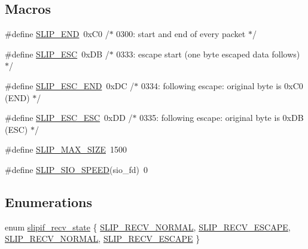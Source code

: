 \subsection*{Macros}
\begin{DoxyCompactItemize}
\item 
\#define \hyperlink{openmote-cc2538_2lwip_2src_2netif_2slipif_8c_ac08c4b8e75c6456f5654145f8b001005}{S\+L\+I\+P\+\_\+\+E\+ND}~0x\+C0 /$\ast$ 0300\+: start and end of every packet $\ast$/
\item 
\#define \hyperlink{openmote-cc2538_2lwip_2src_2netif_2slipif_8c_a379cfa838122508f0e88fbbe8ce80c47}{S\+L\+I\+P\+\_\+\+E\+SC}~0x\+D\+B /$\ast$ 0333\+: escape start (one byte escaped data follows) $\ast$/
\item 
\#define \hyperlink{openmote-cc2538_2lwip_2src_2netif_2slipif_8c_a660be27a37d4105d47000a333dd26c1a}{S\+L\+I\+P\+\_\+\+E\+S\+C\+\_\+\+E\+ND}~0x\+D\+C /$\ast$ 0334\+: following escape\+: original byte is 0x\+C0 (\+E\+N\+D) $\ast$/
\item 
\#define \hyperlink{openmote-cc2538_2lwip_2src_2netif_2slipif_8c_a75cd5d5e3cdfa54f2a7c6d137406bb72}{S\+L\+I\+P\+\_\+\+E\+S\+C\+\_\+\+E\+SC}~0x\+D\+D /$\ast$ 0335\+: following escape\+: original byte is 0x\+D\+B (\+E\+S\+C) $\ast$/
\item 
\#define \hyperlink{openmote-cc2538_2lwip_2src_2netif_2slipif_8c_accf448f9dabb0f33ef46b40355691cab}{S\+L\+I\+P\+\_\+\+M\+A\+X\+\_\+\+S\+I\+ZE}~1500
\item 
\#define \hyperlink{openmote-cc2538_2lwip_2src_2netif_2slipif_8c_a2a9e9ed81732a6794a9b9a712f75a1cc}{S\+L\+I\+P\+\_\+\+S\+I\+O\+\_\+\+S\+P\+E\+ED}(sio\+\_\+fd)~0
\end{DoxyCompactItemize}
\subsection*{Enumerations}
\begin{DoxyCompactItemize}
\item 
enum \hyperlink{openmote-cc2538_2lwip_2src_2netif_2slipif_8c_ad55f60b1f38e904fddc564c425f2eade}{slipif\+\_\+recv\+\_\+state} \{ \hyperlink{native_2lwip_2src_2netif_2slipif_8c_ad55f60b1f38e904fddc564c425f2eadea76ffc42dd0ef84fa1a9aabaa8bb8d910}{S\+L\+I\+P\+\_\+\+R\+E\+C\+V\+\_\+\+N\+O\+R\+M\+AL}, 
\hyperlink{native_2lwip_2src_2netif_2slipif_8c_ad55f60b1f38e904fddc564c425f2eadeadeef6da5e42101930e2dff586a8ad76f}{S\+L\+I\+P\+\_\+\+R\+E\+C\+V\+\_\+\+E\+S\+C\+A\+PE}, 
\hyperlink{openmote-cc2538_2lwip_2src_2netif_2slipif_8c_ad55f60b1f38e904fddc564c425f2eadea76ffc42dd0ef84fa1a9aabaa8bb8d910}{S\+L\+I\+P\+\_\+\+R\+E\+C\+V\+\_\+\+N\+O\+R\+M\+AL}, 
\hyperlink{openmote-cc2538_2lwip_2src_2netif_2slipif_8c_ad55f60b1f38e904fddc564c425f2eadeadeef6da5e42101930e2dff586a8ad76f}{S\+L\+I\+P\+\_\+\+R\+E\+C\+V\+\_\+\+E\+S\+C\+A\+PE}
 \}
\end{DoxyCompactItemize}
